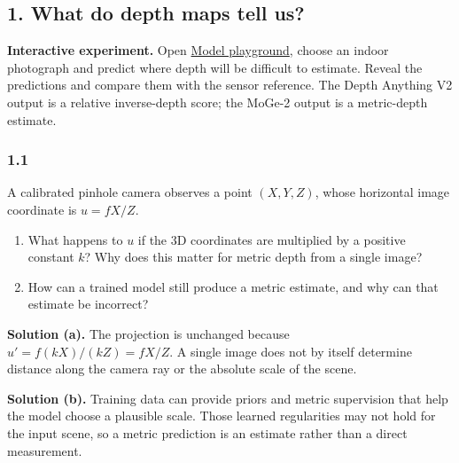 \documentclass[11pt,a4paper]{article}
\newcommand{\laburl}{https://sosekie.github.io/Unibe-CVG-CV-Interactive-Labs/tutorial-11/}
\newcommand{\lablink}[2]{\href{\laburl\##1}{#2}}
\begin{document}
\subsection*{1. What do depth maps tell us?}
\noindent\textbf{Interactive experiment.}
Open \lablink{play}{Model playground}, choose an indoor photograph and predict where depth will be difficult to estimate.
Reveal the predictions and compare them with the sensor reference.
The Depth Anything V2 output is a relative inverse-depth score; the MoGe-2 output is a metric-depth estimate.
\par\noindent
\begin{minipage}{\linewidth}
\subsubsection*{1.1}
A calibrated pinhole camera observes a point $(X,Y,Z)$, whose horizontal image coordinate is $u=fX/Z$.
\begin{enumerate}[label=(\alph*),nosep]
\item What happens to $u$ if the 3D coordinates are multiplied by a positive constant $k$?
Why does this matter for metric depth from a single image?
\item How can a trained model still produce a metric estimate, and why can that estimate be incorrect?
\end{enumerate}
\ifsolutions
\noindent\textbf{Solution (a).}
The projection is unchanged because $u'=f(kX)/(kZ)=fX/Z$.
A single image does not by itself determine distance along the camera ray or the absolute scale of the scene.

\noindent\textbf{Solution (b).}
Training data can provide priors and metric supervision that help the model choose a plausible scale.
Those learned regularities may not hold for the input scene, so a metric prediction is an estimate rather than a direct measurement.
\fi
\end{minipage}
\par\medskip
\par\noindent
\end{document}
